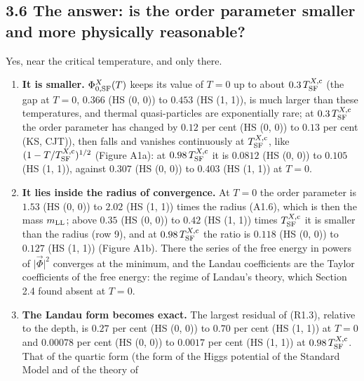 \documentclass[
  10pt,
]{article}
\providecommand{\tightlist}{%
  \setlength{\itemsep}{0pt}\setlength{\parskip}{0pt}}
\begin{document}
\hypertarget{the-answer-is-the-order-parameter-smaller-and-more-physically-reasonable}{%
\subsection{3.6 The answer: is the order parameter smaller and more
physically
reasonable?}\label{the-answer-is-the-order-parameter-smaller-and-more-physically-reasonable}}

Yes, near the critical temperature, and only there.

\begin{enumerate}
\def\labelenumi{\arabic{enumi}.}
\tightlist
\item
  \textbf{It is smaller.} \(\Phi^X_{0,{\rm SF}}(T)\) keeps its value of
  \(T=0\) up to about \(0.3\,T^{X,{\rm c}}_{\rm SF}\) (the gap at
  \(T=0\), \(0.366\) (HS (0, 0)) to \(0.453\) (HS (1, 1)), is much
  larger than these temperatures, and thermal quasi-particles are
  exponentially rare; at \(0.3\,T^{X,{\rm c}}_{\rm SF}\) the order
  parameter has changed by \(0.12\) per cent (HS (0, 0)) to \(0.13\) per
  cent (KS, CJT)), then falls and vanishes continuously at
  \(T^{X,{\rm c}}_{\rm SF}\), like
  \((1-T/T^{X,{\rm c}}_{\rm SF})^{1/2}\) (Figure A1a): at
  \(0.98\,T^{X,{\rm c}}_{\rm SF}\) it is \(0.0812\) (HS (0, 0)) to
  \(0.105\) (HS (1, 1)), against \(0.307\) (HS (0, 0)) to \(0.403\) (HS
  (1, 1)) at \(T=0\).
\item
  \textbf{It lies inside the radius of convergence.} At \(T=0\) the
  order parameter is \(1.53\) (HS (0, 0)) to \(2.02\) (HS (1, 1)) times
  the radius (A1.6), which is then the mass \(m_{\rm LL}\); above
  \(0.35\) (HS (0, 0)) to \(0.42\) (HS (1, 1)) times
  \(T^{X,{\rm c}}_{\rm SF}\) it is smaller than the radius (row 9), and
  at \(0.98\,T^{X,{\rm c}}_{\rm SF}\) the ratio is \(0.118\) (HS (0, 0))
  to \(0.127\) (HS (1, 1)) (Figure A1b). There the series of the free
  energy in powers of \(\lvert\vec\Phi\rvert^2\) converges at the
  minimum, and the Landau coefficients are the Taylor coefficients of
  the free energy: the regime of Landau's theory, which Section 2.4
  found absent at \(T=0\).
\item
  \textbf{The Landau form becomes exact.} The largest residual of
  (R1.3), relative to the depth, is \(0.27\) per cent (HS (0, 0)) to
  \(0.70\) per cent (HS (1, 1)) at \(T=0\) and \(0.00078\) per cent (HS
  (0, 0)) to \(0.0017\) per cent (HS (1, 1)) at
  \(0.98\,T^{X,{\rm c}}_{\rm SF}\). That of the quartic form (the form
  of the Higgs potential of the Standard Model and of the theory of

\end{enumerate}
\end{document}
